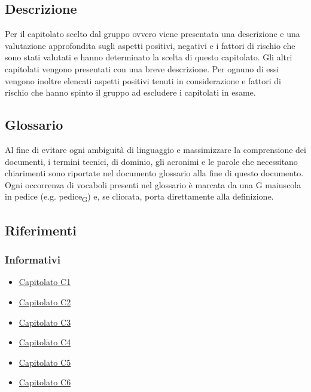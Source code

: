 \documentclass[12pt,a4paper]{article}
\begin{document}
\subsection{Descrizione}
Per il capitolato scelto dal gruppo ovvero \prj viene presentata una descrizione e una valutazione approfondita sugli aspetti positivi, negativi e i fattori di rischio che sono stati valutati e hanno determinato la scelta di questo capitolato. Gli altri capitolati vengono presentati con una breve descrizione. Per ognuno di essi vengono inoltre elencati aspetti positivi tenuti in considerazione e fattori di rischio che hanno spinto il gruppo ad escludere i capitolati in esame.

\subsection{Glossario}
Al fine di evitare ogni ambiguità di linguaggio e massimizzare la comprensione dei documenti, i termini tecnici, di dominio, gli acronimi e le parole che necessitano chiarimenti sono riportate nel documento glossario alla fine di questo documento. Ogni occorrenza di vocaboli presenti nel glossario è marcata da una G maiuscola in pedice (e.g. pedice\textsubscript{G}) e, se cliccata, porta direttamente alla definizione.

\subsection{Riferimenti}
\subsubsection{Informativi}

\begin{itemize}
\item \href{http://www.math.unipd.it/~tullio/IS-1/2015/Progetto/C1.pdf}{Capitolato C1}
\item \href{http://www.math.unipd.it/~tullio/IS-1/2015/Progetto/C2.pdf}{Capitolato C2}
\item \href{http://www.math.unipd.it/~tullio/IS-1/2015/Progetto/C3.pdf}{Capitolato C3}
\item \href{http://www.math.unipd.it/~tullio/IS-1/2015/Progetto/C4.pdf}{Capitolato C4}
\item \href{http://www.math.unipd.it/~tullio/IS-1/2015/Progetto/C5.pdf}{Capitolato C5}
\item \href{http://www.math.unipd.it/~tullio/IS-1/2015/Progetto/C6.pdf}{Capitolato C6}
\end{itemize}
\end{document}
